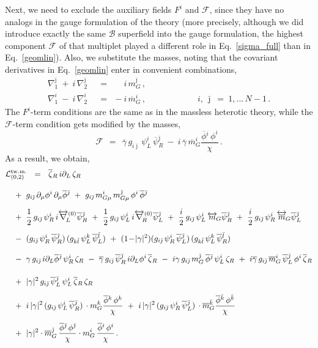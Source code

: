 \documentclass[12pt]{article}
\def\beq{\begin{equation}}
\def\eeq{\end{equation}}
\newcommand{\p}{\partial}
\newcommand{\ov}{\overline}
\newcommand{\mc}[1]{\mathcal{#1}}
\newcommand{\bzr}{\ov{\zeta}{}_R}
\newcommand{\zr}{\zeta_R}
\newcommand{\bgamma}{\ov{\gamma}}
\newcommand{\bpsi}{\ov{\psi}{}}
\newcommand{\bphi}{\ov{\phi}{}}
\newcommand{\ff}{\mc{F}}
\newcommand{\bj}{{\bar \jmath}}
\newcommand{\bk}{{\bar k}}
\newcommand{\bl}{{\bar l}}
\begin{document}
Next, we need to exclude the auxiliary fields $ F^i $ and $ \ff $, since they have no analogs
	in the gauge formulation of the theory 
	(more precisely, although we did introduce  exactly the same $\mc{B}$ superfield into the gauge formulation, 
	the highest component $\ff$ of that multiplet played a different role in Eq.~\eqref{sigma_full} than in Eq.~\eqref{geomlin}).
	Also, we substitute the masses, noting that the covariant derivatives in Eq.~\eqref{geomlin} 
	enter in convenient combinations, 
\begin{align*}
%
	\nabla_1^\bj ~+~ i\,\nabla_2^\bj & ~~=~~ \phantom{-} i\,m_G^\bj\,,    \\[2mm]
%
	\nabla_1^i ~-~ i\,\nabla_2^i     & ~~=~~ -i\,\ov{m}{}_G^i\,,
	\qquad\qquad\qquad i,\,\bj ~=~ 1,...\,N-1\,.
\end{align*}
The $ F^i $-term conditions are the same as in the massless heterotic theory, while the $ \ff $-term condition
	gets modified by the masses,
\beq
\label{ffterm}
	\ff ~~=~~ \bgamma\, g_{i\bj}\, \psi_L^i\, \bpsi_R^\bj
	      ~-~ i\, \bgamma\, \ov{m}_G^i \frac{\bphi^i\, \phi^i}{\chi}\,.
\eeq
	As a result, we obtain, 
\begin{align}
%
\notag
	\mc{L}_{(0,2)}^\text{tw.m.} & ~~=~~ 
	\bzr\, i\p_L\, \zr \\[3mm]
%
\notag
	&\!\!\!\!\!\!\!\!\!\!\!\!
	~+~ g_{i\bj}\, \p_\mu\phi^i\, \p_\mu\bphi^\bj ~+~ g_{i\bj}\, m_{G\mu}^i\,m_{G\mu}^\bj\, \phi^i\, \bphi^\bj
	\\[2mm]
%
\notag
	&\!\!\!\!\!\!\!\!\!\!\!\!
	~+~ \frac{1}{2}\,g_{i\bj}\,\psi_R^i\,i\overleftrightarrow{\nabla}{}_{\!\!L}^{(0)} \bpsi_R^\bj 
	~+~ \frac{1}{2}\,g_{i\bj}\,\psi_L^i\,i\overleftrightarrow{\nabla}{}_{\!\!R}^{(0)} \bpsi_L^\bj 
	~+~ \frac{i}{2}\,g_{i\bj}\,\psi_L^i\, \overleftrightarrow{m}{}_{\!G} \bpsi_R^\bj
	~+~ \frac{i}{2}\,g_{i\bj}\,\psi_R^i\, \overleftrightarrow{\ov{m}}{}_{\!G} \bpsi_L^\bj
	\\[2mm]
%
\label{sgeom_phys}
	&\!\!\!\!\!\!\!\!\!\!\!\!
	~-~ (g_{i\bj}\, \psi_R^i\, \bpsi_R^\bj)\,(g_{k\bl}\, \psi_L^k\, \bpsi_L^\bl) 
	~+~ (1 \!-\!|\gamma|^2)(g_{i\bj}\, \psi_R^i\, \bpsi_L^\bj)\,(g_{k\bl}\,\psi_L^k\,\bpsi_R^\bl)
	\\[3mm]
%
\notag
	&\!\!\!\!\!\!\!\!\!\!\!\!
	~-~ \gamma\, g_{i\bj}\, i\p_L\bphi^\bj\, \psi_R^i\,\zr 
	~-~ \bgamma\, g_{i\bj}\, \bpsi_R^\bj\, i\p_L\phi^i\, \bzr
	~-~ i\gamma\, g_{i\bj}\, m_G^\bj\,\bphi^\bj\, \psi_L^i\,\zr
	~+~ i\bgamma\, g_{i\bj}\,\ov{m}{}_G^i\, \bpsi_L^\bj\, \phi^i\,\bzr
	\\[4mm]
%
\notag
	&\!\!\!\!\!\!\!\!\!\!\!\!
	~+~ |\gamma|^2\, g_{i\bj}\, \bpsi_L^\bj\, \psi_L^i\, \bzr\, \zr
	\\[2mm]
%
\notag
	&\!\!\!\!\!\!\!\!\!\!\!\!
	~+~ i\, |\gamma|^2\, (g_{i\bj}\,\psi_L^i\,\bpsi_R^\bj)\, \cdot m_G^k \frac{\bphi^k\, \phi^k}{\chi}
	~+~ i\, |\gamma|^2\, (g_{i\bj}\,\psi_R^i\,\bpsi_L^\bj)\, \cdot \ov{m}{}_G^\bk \frac{\bphi^\bk\,\phi^\bk}{\chi}
	\\[2mm]
%
\notag
	&\!\!\!\!\!\!\!\!\!\!\!\!
	~+~ |\gamma|^2 \cdot \ov{m}{}_G^\bj\,\frac{\bphi^\bj\,\phi^\bj}{\chi}
			\cdot m_G^i\, \frac{\bphi^i\, \phi^i}{\chi}\,.
\end{align}
\end{document}
